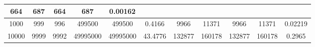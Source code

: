 \documentclass[a4paper,12pt]{article}
\begin{document}
\begin{table}[h]
\begin{tabular}{|c|ccccc|ccccc|}
            \multicolumn{1}{c|}{664} &
            \multicolumn{1}{c|}{687} &
            \multicolumn{1}{c|}{664} &
            \multicolumn{1}{c|}{687} &
            0.00162 \\ \hline
            1000 &
            \multicolumn{1}{c|}{999} &
            \multicolumn{1}{c|}{996} &
            \multicolumn{1}{c|}{499500} &
            \multicolumn{1}{c|}{499500} &
            0.4166 &
            \multicolumn{1}{c|}{9966} &
            \multicolumn{1}{c|}{11371} &
            \multicolumn{1}{c|}{9966} &
            \multicolumn{1}{c|}{11371} &
            0.02219 \\ \hline
            10000 &
            \multicolumn{1}{c|}{9999} &
            \multicolumn{1}{c|}{9992} &
            \multicolumn{1}{c|}{49995000} &
            \multicolumn{1}{c|}{49995000} &
            43.4776 &
            \multicolumn{1}{c|}{132877} &
            \multicolumn{1}{c|}{160178} &
            \multicolumn{1}{c|}{132877} &
            \multicolumn{1}{c|}{160178} &
            0.2965 \\ \hline
        \end{tabular}
    \end{table}
\end{document}
